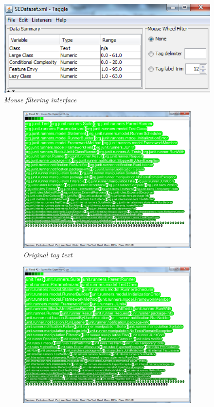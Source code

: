 \begin{figure}[!htb]
  	\centering
   	\includegraphics[scale=0.75]{mousefilter.png}
  	\caption{\textit{Mouse filtering interface}}
	\label{fig:filtering1}
\end{figure}

\begin{figure}[!htb]
\begin{subfigure}{\textwidth}
	\centering
	\includegraphics[scale=0.35]{delimiterfilter1.png}
  	\caption{\textit{Original tag text}}
\end{subfigure}
\begin{subfigure}{\textwidth}
 	 \centering
	 \includegraphics[scale=0.35]{delimiterfilter2.png}

\end{subfigure}
\end{figure}
